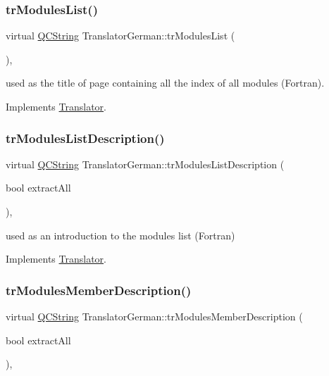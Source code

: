 \subsubsection{\texorpdfstring{trModulesList()}{trModulesList()}}
{\footnotesize\ttfamily virtual \mbox{\hyperlink{class_q_c_string}{Q\+C\+String}} Translator\+German\+::tr\+Modules\+List (\begin{DoxyParamCaption}{ }\end{DoxyParamCaption})\hspace{0.3cm}{\ttfamily [inline]}, {\ttfamily [virtual]}}

used as the title of page containing all the index of all modules (Fortran). 

Implements \mbox{\hyperlink{class_translator}{Translator}}.

\mbox{\label{class_translator_german_a944ef6a73374eabe6fb7574116829948}} 
\subsubsection{\texorpdfstring{trModulesListDescription()}{trModulesListDescription()}}
{\footnotesize\ttfamily virtual \mbox{\hyperlink{class_q_c_string}{Q\+C\+String}} Translator\+German\+::tr\+Modules\+List\+Description (\begin{DoxyParamCaption}\item[{bool}]{extract\+All }\end{DoxyParamCaption})\hspace{0.3cm}{\ttfamily [inline]}, {\ttfamily [virtual]}}

used as an introduction to the modules list (Fortran) 

Implements \mbox{\hyperlink{class_translator}{Translator}}.

\mbox{\label{class_translator_german_a4902c094e132773299e9a7966de86620}} 
\subsubsection{\texorpdfstring{trModulesMemberDescription()}{trModulesMemberDescription()}}
{\footnotesize\ttfamily virtual \mbox{\hyperlink{class_q_c_string}{Q\+C\+String}} Translator\+German\+::tr\+Modules\+Member\+Description (\begin{DoxyParamCaption}\item[{bool}]{extract\+All }\end{DoxyParamCaption})\hspace{0.3cm}{\ttfamily [inline]}, {\ttfamily [virtual]}}

